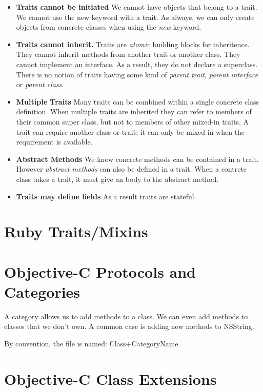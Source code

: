 \begin{itemize}   
\renewcommand{\labelitemi}{$\Box$}
\item \textbf{Traits cannot be initiated}
We cannot have objects that belong to a trait. 
We cannot use the new keyword with a trait. 
As always, we can only create objects from concrete classes when using the \textit{new} keyword.
\item \textbf{Traits cannot inherit.}
Traits are \textit{atomic} building blocks for inheritence.
They cannot inherit methods from another trait or another class. 
They cannot implement an interface. As a result, they do not declare a superclass. 
There is no notion of traits having some kind of
\textit{parent trait}, \textit{parent interface} or \textit{parent class}. 
\item \textbf{Multiple Traits}
Many traits can be combined within a single concrete class definition.
When multiple traits are inherited they can refer to members of their common super class,
but not to members of other mixed-in traits.
A trait can require another class or trait;
it can only be mixed-in when the requirement is available.
\item \textbf{Abstract Methods} 
We know concrete methods can be contained in a trait.
However \textit{abstract methods} can also be defined in a trait.
When a contrete class takes a trait, it must give an body to the abstract method.
\item \textbf{Traits may define fields}
As a result traits are stateful. 
\end{itemize}

\section{Ruby Traits/Mixins}

\section{Objective-C Protocols and Categories}

A category allows us to add methods to a class. 
We can even add methods to classes that we don't own. 
A common case is adding new methods to NSString. 

By convention, the file is named: Class+CategoryName. 


\section{Objective-C Class Extensions}


